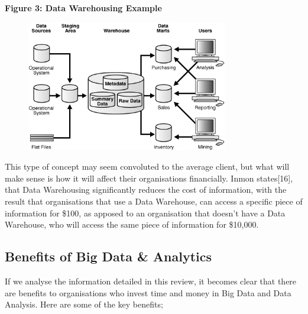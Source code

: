\documentclass[10pt,journal,compsoc]{IEEEtran}
\begin{document}
\textbf{Figure 3: Data Warehousing Example}
\begin{figure}[ht!]
	\centering
	\includegraphics[width=88mm]{dwarehouse.jpg}
\end{figure}

This type of concept may seem convoluted to the average client, but what will make sense is how it will affect their organisations financially. Inmon states[16], that Data Warehousing significantly reduces the cost of information, with the result that organisations that use a Data Warehouse, can access a specific piece of information for \$100, as apposed to an organisation that doesn't have a Data Warehouse, who will access the same piece of information for \$10,000. 

\subsection{Benefits of Big Data \& Analytics}
If we analyse the information detailed in this review, it becomes clear that there are benefits to organisations who invest time and money in Big Data and Data Analysis. Here are some of the key benefits;
\end{document}
